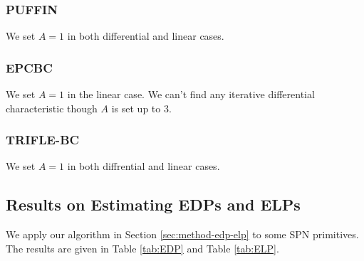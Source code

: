 \subsubsection{PUFFIN \cite{cheng2008puffin}} We set $A=1$ in both differential and linear cases.  

\subsubsection{EPCBC \cite{yap2011epcbc}} We set $A=1$ in the linear case. We can't find any iterative differential characteristic though $A$ is set up to 3. 

\subsubsection{TRIFLE-BC \cite{Datta2019trifle}} We set $A=1$ in both diffrential and linear cases. 


\subsection{Results on Estimating EDPs and ELPs}

We apply our algorithm in Section \ref{sec:method-edp-elp} to some SPN primitives. The results are given in Table \ref{tab:EDP} and Table \ref{tab:ELP}. 

